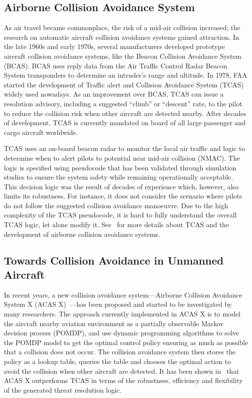 \documentclass[orivec]{llncs}
\begin{document}
\subsection{Airborne Collision Avoidance System}
\label{ssec:intro:ACAS}

As air travel became commonplace, the risk of a mid-air collision increased; 
the research on automatic aircraft collision avoidance systems gained attraction. 
In the late 1960s and early 1970s, several manufacturers developed prototype aircraft collision avoidance systems, like the Beacon Collision Avoidance System (BCAS).
BCAS uses reply data from the Air Traffic Control Radar Beacon System transponders to determine an intruder's  range and altitude.
In 1978, FAA started the development of Traffic alert and Collision Avoidance System (TCAS)~\cite{TCAS,article} widely used nowadays.
As an improvement over BCAS, TCAS can issue a resolution advisory, including a suggested ``climb'' or ``descent'' rate, to the pilot to reduce the collision risk when other aircraft are detected nearby.
After decades of development, TCAS is currently mandated on board of all large passenger and cargo aircraft worldwide.

TCAS uses an on-board beacon radar to monitor the local air traffic and logic to determine when to alert pilots to potential near mid-air collision (NMAC). 
The logic is specified using pseudocode that has been validated through simulation studies to ensure the system safety while remaining operationally acceptable. 
This decision logic was the result of decades of experience which, however, also limits its robustness.
For instance, it does not consider the scenario where pilots do not follow the suggested collision avoidance manoeuvre.
Due to the high complexity of the TCAS pseudocode, it is hard to fully understand the overall TCAS logic, let alone modify it.
See~\cite{article} for more details about TCAS and the development of airborne collision avoidance systems.


\subsection{Towards Collision Avoidance in Unmanned Aircraft}
\label{ssec:intro:toardsUAV}

In recent years, a new collision avoidance system---Airborne Collision Avoidance System X (ACAS X)~\cite{ACASX}---has been proposed and started to be investigated by many researchers.
The approach currently implemented in ACAS X is to model the aircraft nearby aviation environment as a partially observable Markov decision process (POMDP), and use dynamic programming algorithms to solve the POMDP model to get the optimal control policy ensuring as much as possible that a collision does not occur.
The collision avoidance system then stores the policy as a lookup table, queries the table and chooses the optimal action to avoid the collision when other aircraft are detected.
It has been shown in~\cite{ACASX} that ACAS X outperforms TCAS in terms of the robustness, efficiency and flexibility of the generated threat resolution logic.
\end{document}

